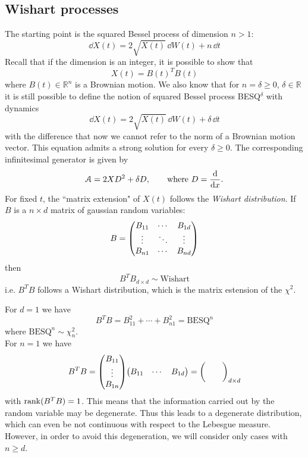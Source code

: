 \subsection{Wishart processes}
The starting point is the squared Bessel process of dimension $n>1$:
\begin{equation*}
    \dd X(t) = 2\sqrt{X(t)}\,\dd W(t) + n\,\dd t
\end{equation*}
Recall that if the dimension is an integer, it is possible to show that
\begin{equation*}
    X(t) = B(t)^TB(t)
\end{equation*}
where $B(t)\in\mathbb{R}^n$ is a Brownian motion. We also know that for $n = \delta \ge 0$, $\delta\in\mathbb{R}$ it is still possible to define the notion of squared Bessel process BESQ$^\delta$ with dynamics
\begin{equation*}
    \dd X(t) = 2\sqrt{X(t)}\,\dd W(t) + \delta\,\dd t
\end{equation*}
with the difference that now we cannot refer to the norm of a Brownian motion vector. This equation admits a strong solution for every $\delta\ge0$. The corresponding infinitesimal generator is given by
\begin{equation*}
    \mathcal{A} = 2XD^2 + \delta D, \qquad \text{where } D = \dv{}{x}.
\end{equation*}
For fixed $t$, the ``matrix extension" of $X(t)$ follows the \emph{Wishart distribution}. If $B$ is a $n\times d$ matrix of gaussian random variables:
\begin{equation}
    B = \mqty(B_{11} & \cdots & B_{1d} \\
              \vdots & \ddots & \vdots \\
              B_{n1} & \cdots & B_{nd})
\end{equation}
then
\begin{equation}
    B^TB_{d\times d} \sim \text{Wishart}
\end{equation}
i.e. $B^TB$ follows a Wishart distribution, which is the matrix estension of the $\chi^2$. \\
\begin{example}{}{}{}
    For $d=1$ we have
    \begin{equation*}
        B^TB = B_{11}^2 + \cdots + B^2_{n1} = \text{BESQ}^n
    \end{equation*}
    where $\text{BESQ}^n \sim \chi^2_n$. \\
    For $n=1$ we have
    \begin{equation*}
        B^TB = \mqty(B_{11} \\ \vdots \\ B_{1n})\mqty(B_{11} & \cdots & B_{1d}) = \mqty( & & \\ & & )_{d\times d}
    \end{equation*}
    with $\rank(B^TB) = 1$. This means that the information carried out by the random variable may be degenerate. Thus this leads to a degenerate distribution, which can even be not continuous with respect to the Lebesgue measure. However, in order to avoid this degeneration, we will consider only cases with $n\ge d$.
\end{example}
